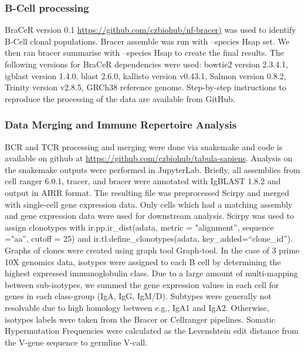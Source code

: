 \subsubsection{B-Cell processing}
BraCeR\cite{lindeman2018bracer} version 0.1 \url{https://github.com/czbiohub/nf-bracer)} was used to identify B-Cell clonal
populations. Bracer assemble was run with --species Hsap set. We then ran bracer summarise
with --species Hsap to create the final results. The following versions for BraCeR dependencies
were used: bowtie2 version 2.3.4.1, igblast version 1.4.0, blast 2.6.0, kallisto version v0.43.1,
Salmon version 0.8.2, Trinity version v2.8.5, GRCh38 reference genome. Step-by-step
instructions to reproduce the processing of the data are available from GitHub.
\subsubsection{Data Merging and Immune Repertoire Analysis}
BCR and TCR processing and merging were done via snakemake\cite{koster2012snakemake} and code is available on
github at \url{https://github.com/czbiohub/tabula-sapiens}. Analysis on the snakemake outputs were
performed in JupyterLab. Briefly, all assemblies from cell ranger 6.0.1, tracer, and bracer were
annotated with IgBLAST 1.8.2\cite{ye_igblast_2013} and output in AIRR format. The resulting file was preprocessed
Scirpy\cite{sturm_scirpy_2020} and merged with single-cell gene expression data. Only cells which had a matching
assembly and gene expression data were used for downstream analysis. Scirpy was used to
assign clonotypes with ir.pp.ir\_dist(adata, metric = "alignment”, sequence ="aa”, cutoff = 25) and
ir.tl.define\_clonotypes(adata, key\_added=``clone\_id”). Graphs of clones were created using graph
tool Graph-tool\cite{peixoto_graph-tool_2014}. In the case of 3 prime 10X genomics data, isotypes
were assigned to each B cell by determining the highest expressed immunoglobulin class. Due to a large amount of multi-mapping between sub-isotypes, we
summed the gene expression values in each cell for genes in each class-group (IgA, IgG, IgM/D).
Subtypes were generally not resolvable due to high homology between e.g., IgA1 and IgA2. Otherwise, isotypes labels were taken from the Bracer or Cellranger pipelines.
Somatic Hypermutation Frequencies were calculated as the Levenshtein edit distance from the V-gene sequence
to germline V-call.
